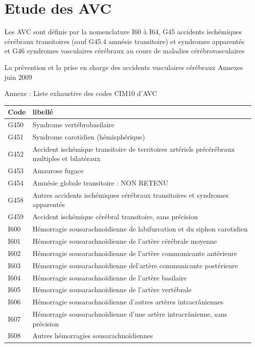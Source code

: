 \documentclass[12pt,english,french,twoside]{book}\usepackage[]{graphicx}\usepackage[]{color}
\begin{document}
\section{Etude des AVC}

Les AVC sont définis par la nomenclature I60 à I64, G45 accidents ischémiques cérébraux transitoires (sauf G45.4 amnésie transitoire) et syndromes apparentés et G46 syndromes vasculaires cérébraux au cours de maladies cérébrovasculaires

La prévention et la prise en charge des accidents vasculaires cérébraux  Annexes 
juin 2009

Annexe : Liste exhaustive des codes CIM10 d’AVC
{\footnotesize
\begin{longtable}{|l|l|}
 \hline
 Code & libellé\\
 \hline
 G450 & Syndrome vertébrobasilaire \\
 G451 & Syndrome carotidien (hémisphérique) \\
 G452 & Accident ischémique transitoire de territoires artériels précérébraux multiples et bilatéraux \\
 G453 & Amaurose fugace \\
 G454 & Amnésie globale transitoire : NON RETENU \\
 G458 & Autres accidents ischémiques cérébraux transitoires et syndromes apparentés \\
 G459 & Accident ischémique cérébral transitoire, sans précision \\
 I600 & Hémorragie sousarachnoïdienne de labifurcation et du siphon carotidien \\
 I601 & Hémorragie sousarachnoïdienne de l'artère cérébrale moyenne \\
 I602 & Hémorragie sousarachnoïdienne de l'artère communicante antérieure \\
 I603 & Hémorragie sousarachnoïdienne del'artère communicante postérieure \\
 I604 & Hémorragie sousarachnoïdienne de l'artère basilaire \\
 I605 & Hémorragie sousarachnoïdienne de l'artère vertébrale \\
 I606 & Hémorragie sousarachnoïdienne d'autres artères intracrâniennes \\
 I607 & Hémorragie sousarachnoïdienne d'une artère intracrânienne, sans précision \\
 I608 & Autres hémorragies sousarachnoïdiennes \\

\end{longtable}}
\end{document}
